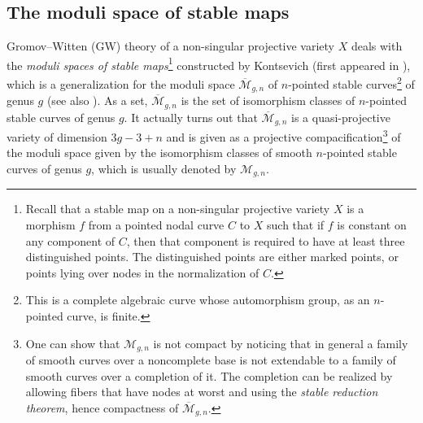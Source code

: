 \documentclass[11pt,colorinlistoftodos]{amsart}
\numberwithin{equation}{subsection}
\theoremstyle{plain}
\theoremstyle{definition}
\theoremstyle{remark}
\newcommand{\calM}{\mathcal{M}}
\begin{document}
\subsection{The moduli space of stable maps}
Gromov--Witten (GW) theory \cite{Gromov1985,Witten1991,Behrend1997} of a non-singular projective variety $X$ deals with the \emph{moduli spaces of stable maps}\footnote{Recall that a stable map on a non-singular projective variety $X$ is a morphism $f$ from a pointed nodal curve $C$ to $X$ such that if $f$ is constant on any component of $C$, then that component is required to have at least three distinguished points. The distinguished points are either marked points, or points lying over nodes in the normalization of $C$.} constructed by Kontsevich (first appeared in \cite{Kontsevich1995,KontsevichManin1994}), which is a generalization for the moduli space $\overline{\calM}_{g,n}$ of $n$-pointed stable curves\footnote{This is a complete algebraic curve whose automorphism group, as an $n$-pointed curve, is finite.} of genus $g$ (see also \cite{Pandharipande1999_2,FultonPandharipande1997,HZKKTVPV2003}). As a set, $\overline{\calM}_{g,n}$ is the set of isomorphism classes of $n$-pointed stable curves of genus $g$. It actually turns out that $\overline{\calM}_{g,n}$ is a quasi-projective variety of dimension $3g-3+n$ and is given as a projective compacification\footnote{One can show that $\calM_{g,n}$ is not compact by noticing that in general a family of smooth curves over a noncomplete base is not extendable to a family of smooth curves over a completion of it. The completion can be realized by allowing fibers that have nodes at worst and using the \emph{stable reduction theorem}, hence compactness of $\overline{\calM}_{g,n}$.} of the moduli space given by the isomorphism classes of smooth $n$-pointed stable curves of genus $g$, which is usually denoted by $\calM_{g,n}$.
\end{document}
